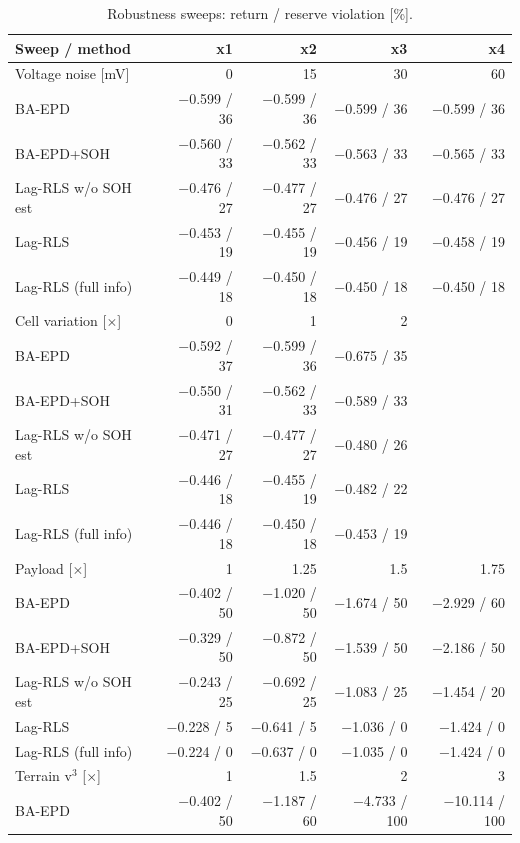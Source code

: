 \begin{table}[t]
\centering
\caption{Robustness sweeps: return / reserve violation [\%].}
\label{tab:robustness}
\footnotesize
\setlength{\tabcolsep}{4pt}
\begin{tabular}{lrrrr}
\toprule
Sweep / method & x1 & x2 & x3 & x4 \\
\midrule
Voltage noise [mV] & 0 & 15 & 30 & 60 \\
   BA-EPD & $-$0.599 / 36 & $-$0.599 / 36 & $-$0.599 / 36 & $-$0.599 / 36 \\
   BA-EPD+SOH & $-$0.560 / 33 & $-$0.562 / 33 & $-$0.563 / 33 & $-$0.565 / 33 \\
   Lag-RLS w/o SOH est & $-$0.476 / 27 & $-$0.477 / 27 & $-$0.476 / 27 & $-$0.476 / 27 \\
   Lag-RLS & $-$0.453 / 19 & $-$0.455 / 19 & $-$0.456 / 19 & $-$0.458 / 19 \\
   Lag-RLS (full info) & $-$0.449 / 18 & $-$0.450 / 18 & $-$0.450 / 18 & $-$0.450 / 18 \\
\midrule
Cell variation [$\times$] & 0 & 1 & 2 &  \\
   BA-EPD & $-$0.592 / 37 & $-$0.599 / 36 & $-$0.675 / 35 &  \\
   BA-EPD+SOH & $-$0.550 / 31 & $-$0.562 / 33 & $-$0.589 / 33 &  \\
   Lag-RLS w/o SOH est & $-$0.471 / 27 & $-$0.477 / 27 & $-$0.480 / 26 &  \\
   Lag-RLS & $-$0.446 / 18 & $-$0.455 / 19 & $-$0.482 / 22 &  \\
   Lag-RLS (full info) & $-$0.446 / 18 & $-$0.450 / 18 & $-$0.453 / 19 &  \\
\midrule
Payload [$\times$] & 1 & 1.25 & 1.5 & 1.75 \\
   BA-EPD & $-$0.402 / 50 & $-$1.020 / 50 & $-$1.674 / 50 & $-$2.929 / 60 \\
   BA-EPD+SOH & $-$0.329 / 50 & $-$0.872 / 50 & $-$1.539 / 50 & $-$2.186 / 50 \\
   Lag-RLS w/o SOH est & $-$0.243 / 25 & $-$0.692 / 25 & $-$1.083 / 25 & $-$1.454 / 20 \\
   Lag-RLS & $-$0.228 / 5 & $-$0.641 / 5 & $-$1.036 / 0 & $-$1.424 / 0 \\
   Lag-RLS (full info) & $-$0.224 / 0 & $-$0.637 / 0 & $-$1.035 / 0 & $-$1.424 / 0 \\
\midrule
Terrain v$^3$ [$\times$] & 1 & 1.5 & 2 & 3 \\
   BA-EPD & $-$0.402 / 50 & $-$1.187 / 60 & $-$4.733 / 100 & $-$10.114 / 100 \\

\end{tabular}
\end{table}
